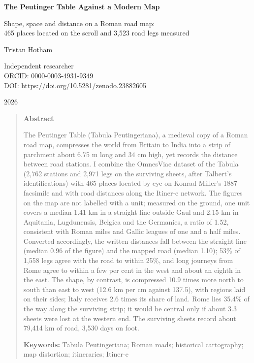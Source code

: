 \documentclass[11pt,a4paper]{article}
\begin{document}
\begin{center}
{\Large\bfseries The Peutinger Table Against a Modern Map\par}
\vspace{0.4em}
{\large Shape, space and distance on a Roman road map:\\465 places located on the scroll and 3,523 road legs measured\par}
\vspace{1.2em}
{\large Tristan Hotham\par}
\vspace{0.3em}
{\small Independent researcher\\
ORCID: 0000-0003-4931-9349\\
DOI: https://doi.org/10.5281/zenodo.23882605\par}
\vspace{0.8em}
2026
\end{center}

\begin{quote}
\small
\begin{center}\textbf{Abstract}\end{center}
The Peutinger Table (Tabula Peutingeriana), a medieval copy of a Roman road map, compresses the world from Britain to India into a strip of parchment about 6.75 m long and 34 cm high, yet records the distance between road stations. I combine the OmnesViae dataset of the Tabula (2,762 stations and 2,971 legs on the surviving sheets, after Talbert's identifications) with 465 places located by eye on Konrad Miller's 1887 facsimile and with road distances along the Itiner-e network. The figures on the map are not labelled with a unit; measured on the ground, one unit covers a median 1.41 km in a straight line outside Gaul and 2.15 km in Aquitania, Lugdunensis, Belgica and the Germanies, a ratio of 1.52, consistent with Roman miles and Gallic leagues of one and a half miles. Converted accordingly, the written distances fall between the straight line (median 0.96 of the figure) and the mapped road (median 1.10); 53\% of 1,558 legs agree with the road to within 25\%, and long journeys from Rome agree to within a few per cent in the west and about an eighth in the east. The shape, by contrast, is compressed 10.9 times more north to south than east to west (12.6 km per cm against 137.5), with regions laid on their sides; Italy receives 2.6 times its share of land. Rome lies 35.4\% of the way along the surviving strip; it would be central only if about 3.3 sheets were lost at the western end. The surviving sheets record about 79,414 km of road, 3,530 days on foot.

\textbf{Keywords:} Tabula Peutingeriana; Roman roads; historical cartography; map distortion; itineraries; Itiner-e
\end{quote}
\end{document}
